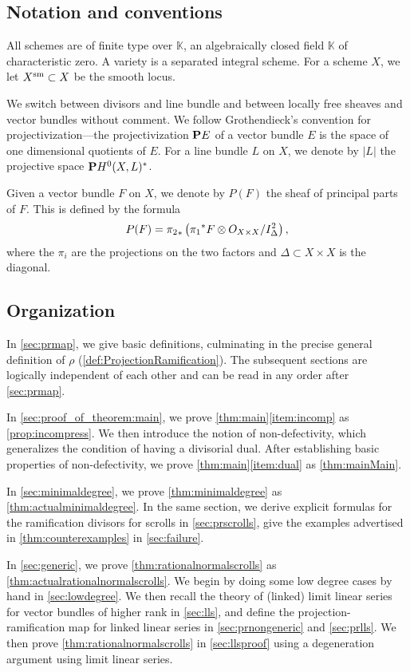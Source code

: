 \documentclass[11pt,reqno]{amsart}
\theoremstyle{plain}
\theoremstyle{definition}
\theoremstyle{remark}
\numberwithin{equation}{section}
\renewcommand{\k}{\mathbb{K}}
\numberwithin{equation}{section}
\renewcommand{\O}{\mathcal O}
\begin{document}
\subsection{Notation and conventions}
All schemes are of finite type over $\k$, an algebraically closed field $\k$ of characteristic zero.
A variety is a separated integral scheme.
For a scheme $X$, we let $X^{\rm sm} \subset X$ be the smooth locus.

We switch between divisors and line bundle and between locally free sheaves and vector bundles without comment.
We follow Grothendieck's convention for projectivization---the projectivization $\P E$ of a vector bundle $E$ is the space of one dimensional quotients of $E$.
For a line bundle $L$ on $X$, we denote by $|L|$ the projective space $\P H^0(X, L)^*$.

Given a vector bundle $F$ on $X$, we denote by $P(F)$ the sheaf of principal parts of $F$.
This is defined by the formula
\[ P(F) = {\pi_2}_* \left( {\pi_1}^* F \otimes \mathcal \O_{X \times X}/ I_{\Delta}^2 \right),\]
where the $\pi_i$ are the projections on the two factors and $\Delta \subset X \times X$ is the diagonal.

\subsection{Organization}
In \autoref{sec:prmap}, we give basic definitions, culminating in the precise general definition of $\rho$ (\autoref{def:ProjectionRamification}).
The subsequent sections are logically independent of each other and can be read in any order after \autoref{sec:prmap}.

In \autoref{sec:proof_of_theorem:main}, we prove \autoref{thm:main}\eqref{item:incomp} as \autoref{prop:incompress}.
We then introduce the notion of non-defectivity, which generalizes the condition of having a divisorial dual.
After establishing basic properties of non-defectivity, we prove \autoref{thm:main}\eqref{item:dual} as \autoref{thm:mainMain}.

In \autoref{sec:minimaldegree}, we prove \autoref{thm:minimaldegree} as \autoref{thm:actualminimaldegree}.
In the same section, we derive explicit formulas for the ramification divisors for scrolls in \autoref{sec:prscrolls}, give the examples advertised in \autoref{thm:counterexamples} in \autoref{sec:failure}.%

In \autoref{sec:generic}, we prove \autoref{thm:rationalnormalscrolls} as \autoref{thm:actualrationalnormalscrolls}.
We begin by doing some low degree cases by hand in \autoref{sec:lowdegree}.
We then recall the theory of (linked) limit linear series for vector bundles of higher rank in \autoref{sec:lls}, and define the projection-ramification map for linked linear series in \autoref{sec:prnongeneric} and \autoref{sec:prlls}.
We then prove \autoref{thm:rationalnormalscrolls} in \autoref{sec:llsproof} using a degeneration argument using limit linear series.
\end{document}
